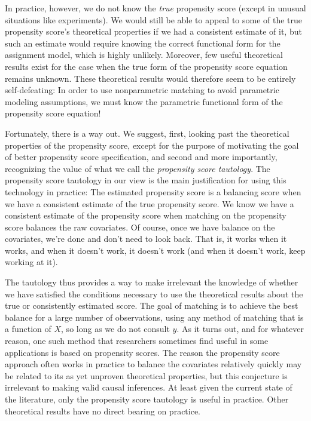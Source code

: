 \documentclass[11pt,titlepage]{article}
\begin{document}
In practice, however, we do not know the \emph{true} propensity score
(except in unusual situations like experiments).  We would still be
able to appeal to some of the true propensity score's theoretical
properties if we had a consistent estimate of it, but such an estimate
would require knowing the correct functional form for the assignment
model, which is highly unlikely.  Moreover, few useful theoretical
results exist for the case when the true form of the propensity score
equation remains unknown.  These theoretical results would therefore
seem to be entirely self-defeating: In order to use nonparametric
matching to avoid parametric modeling assumptions, we must know the
parametric functional form of the propensity score equation!

Fortunately, there is a way out.  We suggest, first, looking past the
theoretical properties of the propensity score, except for the purpose
of motivating the goal of better propensity score specification, and
second and more importantly, recognizing the value of what we call the
\emph{propensity score tautology}.  The propensity score tautology in
our view is the main justification for using this technology in
practice: The estimated propensity score is a balancing score when we
have a consistent estimate of the true propensity score.  We know we
have a consistent estimate of the propensity score when matching on
the propensity score balances the raw covariates.  Of course, once we
have balance on the covariates, we're done and don't need to look
back.  That is, it works when it works, and when it doesn't work, it
doesn't work (and when it doesn't work, keep working at it).

The tautology thus provides a way to make irrelevant the knowledge of
whether we have satisfied the conditions necessary to use the
theoretical results about the true or consistently estimated score.
The goal of matching is to achieve the best balance for a large number
of observations, using any method of matching that is a function of
$X$, so long as we do not consult $y$.  As it turns out, and for
whatever reason, one such method that researchers sometimes find
useful in some applications is based on propensity scores.  The reason
the propensity score approach often works in practice to balance the
covariates relatively quickly may be related to its as yet unproven
theoretical properties, but this conjecture is irrelevant to making
valid causal inferences.  At least given the current state of the
literature, only the propensity score tautology is useful in practice.
Other theoretical results have no direct bearing on practice.
\end{document}
